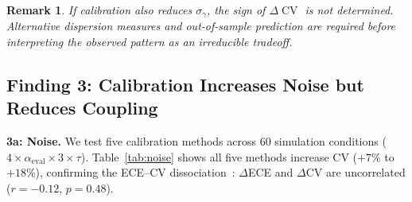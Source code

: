 \documentclass[11pt]{article}
\DeclareMathOperator{\CV}{CV}
\newtheorem{remark}{Remark}
\begin{document}
\begin{remark}
If calibration also reduces $\sigma_\gamma$, the sign of $\Delta\CV$ is not determined. Alternative dispersion measures and out-of-sample prediction are required before interpreting the observed pattern as an irreducible tradeoff.
\end{remark}


\subsection{Finding 3: Calibration Increases Noise but Reduces Coupling}

\textbf{3a: Noise.} We test five calibration methods across 60 simulation conditions ($4 \times \alpha_{\text{eval}} \times 3 \times \tau$). Table~\ref{tab:noise} shows all five methods increase CV ($+7\%$ to $+18\%$), confirming the ECE--CV dissociation~\citep{kumar2023calibration}: $\Delta$ECE and $\Delta$CV are uncorrelated ($r = -0.12$, $p = 0.48$).
\end{document}
